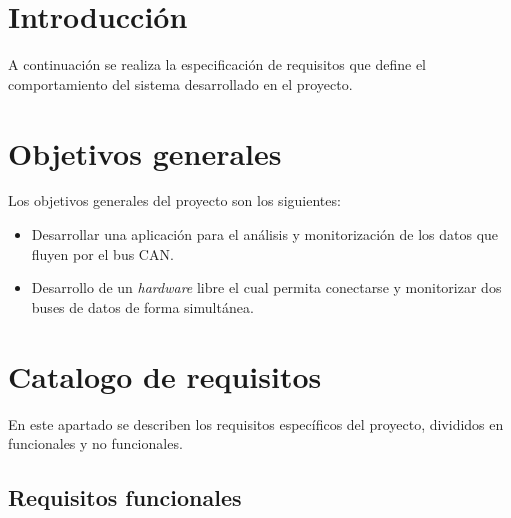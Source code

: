 
\section{Introducción}

A continuación se realiza la especificación de requisitos que define el comportamiento del sistema desarrollado en el proyecto.


\section{Objetivos generales}

Los objetivos generales del proyecto son los siguientes:

\begin{itemize}
\item
Desarrollar una aplicación para el análisis y monitorización de los datos que fluyen por el bus CAN.
\item
Desarrollo de un \emph{hardware} libre el cual permita conectarse y monitorizar dos buses de datos de forma simultánea.
\end{itemize}

\section{Catalogo de requisitos}

En este apartado se describen los requisitos específicos del proyecto, divididos en funcionales y no funcionales.

\subsection{Requisitos funcionales}


